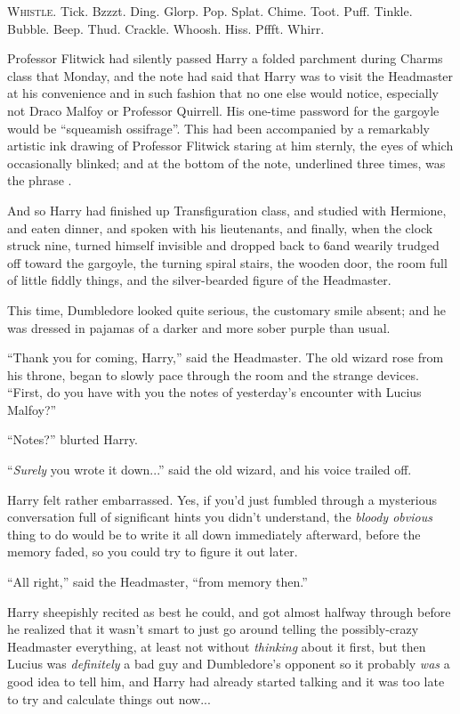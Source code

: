 
\lettrine{W}{histle.} Tick. Bzzzt. Ding. Glorp. Pop. Splat. Chime. Toot. Puff. Tinkle. Bubble. Beep. Thud. Crackle. Whoosh. Hiss. Pffft. Whirr.

Professor Flitwick had silently passed Harry a folded parchment during Charms class that Monday, and the note had said that Harry was to visit the Headmaster at his convenience and in such fashion that no one else would notice, especially not Draco Malfoy or Professor Quirrell. His one-time password for the gargoyle would be “squeamish ossifrage”. This had been accompanied by a remarkably artistic ink drawing of Professor Flitwick staring at him sternly, the eyes of which occasionally blinked; and at the bottom of the note, underlined three times, was the phrase .

And so Harry had finished up Transfiguration class, and studied with Hermione, and eaten dinner, and spoken with his lieutenants, and finally, when the clock struck nine, turned himself invisible and dropped back to 6\PM and wearily trudged off toward the gargoyle, the turning spiral stairs, the wooden door, the room full of little fiddly things, and the silver-bearded figure of the Headmaster.

This time, Dumbledore looked quite serious, the customary smile absent; and he was dressed in pajamas of a darker and more sober purple than usual.

“Thank you for coming, Harry,” said the Headmaster. The old wizard rose from his throne, began to slowly pace through the room and the strange devices. “First, do you have with you the notes of yesterday’s encounter with Lucius Malfoy?”

“Notes?” blurted Harry.

“\emph{Surely} you wrote it down...” said the old wizard, and his voice trailed off.

Harry felt rather embarrassed. Yes, if you’d just fumbled through a mysterious conversation full of significant hints you didn’t understand, the \emph{bloody obvious} thing to do would be to write it all down immediately afterward, before the memory faded, so you could try to figure it out later.

“All right,” said the Headmaster, “from memory then.”

Harry sheepishly recited as best he could, and got almost halfway through before he realized that it wasn’t smart to just go around telling the possibly-crazy Headmaster everything, at least not without \emph{thinking} about it first, but then Lucius was \emph{definitely} a bad guy and Dumbledore’s opponent so it probably \emph{was} a good idea to tell him, and Harry had already started talking and it was too late to try and calculate things out now...

